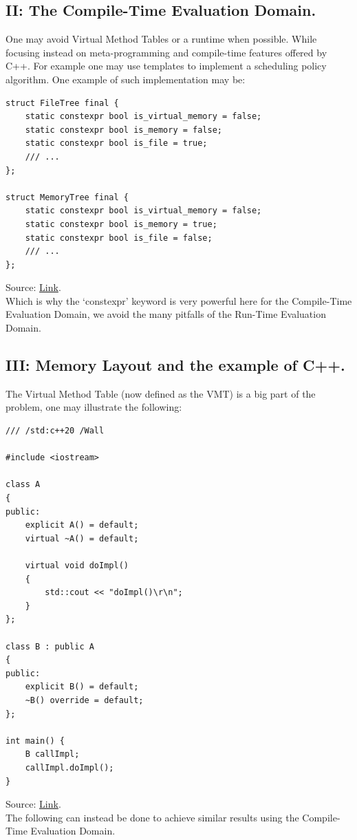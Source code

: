 \documentclass[11pt, a4paper]{article}
\begin{document}
\subsection{II: The Compile-Time Evaluation Domain.}
{
One may avoid Virtual Method Tables or a runtime when possible. While focusing instead on meta-programming and compile-time features offered by C++. 
For example one may use templates to implement a scheduling policy algorithm.
One example of such implementation may be:

\begin{lstlisting}
struct FileTree final {
    static constexpr bool is_virtual_memory = false;
    static constexpr bool is_memory = false;
    static constexpr bool is_file = true;
    /// ...
};

struct MemoryTree final {
    static constexpr bool is_virtual_memory = false;
    static constexpr bool is_memory = true;
    static constexpr bool is_file = false;
    /// ...
};
\end{lstlisting} Source: \href{https://github.com/ne-foss-org/nekernel/blob/develop/src/kernel/KernelKit/CoreProcessScheduler.h#L78-L105}{Link}. \\ Which is why the `constexpr' keyword is very powerful here for the Compile-Time Evaluation Domain, we avoid the many pitfalls of the Run-Time Evaluation Domain.

\subsection{III: Memory Layout and the example of C++.}
{
The Virtual Method Table (now defined as the VMT) is a big part of the problem, one may illustrate the following:

\begin{lstlisting}
/// /std:c++20 /Wall

#include <iostream>

class A
{
public:
    explicit A() = default;
    virtual ~A() = default;

    virtual void doImpl() 
    {
        std::cout << "doImpl()\r\n";
    }
};

class B : public A
{
public:
    explicit B() = default;
    ~B() override = default;
};

int main() {
    B callImpl;
    callImpl.doImpl();
}
\end{lstlisting} Source: \href{https://godbolt.org/z/aK6Y98xnd}{Link}. \\The following can instead be done to achieve similar results using the Compile-Time Evaluation Domain.

}}
\end{document}
